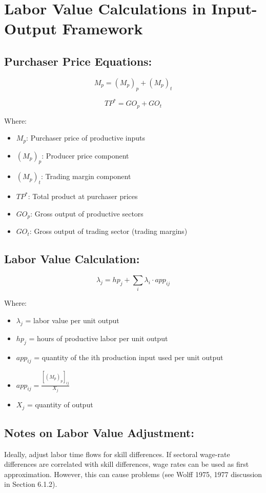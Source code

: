 
\section*{Labor Value Calculations in Input-Output Framework}

\subsection*{Purchaser Price Equations:}
\[
M_p = (M_p)_p + (M_p)_t
\]

\[
TP^* = GO_p + GO_t
\]

Where:
\begin{itemize}
    \item $M_p$: Purchaser price of productive inputs
    \item $(M_p)_p$: Producer price component
    \item $(M_p)_t$: Trading margin component
    \item $TP^*$: Total product at purchaser prices
    \item $GO_p$: Gross output of productive sectors
    \item $GO_t$: Gross output of trading sector (trading margins)
\end{itemize}

\subsection*{Labor Value Calculation:}
\[
\lambda_j = hp_j + \sum_i \lambda_i \cdot app_{ij}
\]

Where:
\begin{itemize}
    \item $\lambda_j$ = labor value per unit output
    \item $hp_j$ = hours of productive labor per unit output
    \item $app_{ij}$ = quantity of the ith production input used per unit output
    \item $app_{ij} = \frac{[(M_p)_p]_{ij}}{X_j}$
    \item $X_j$ = quantity of output
\end{itemize}

\subsection*{Notes on Labor Value Adjustment:}
Ideally, adjust labor time flows for skill differences. If sectoral wage-rate differences are correlated with skill differences, wage rates can be used as first approximation. However, this can cause problems (see Wolff 1975, 1977 discussion in Section 6.1.2).